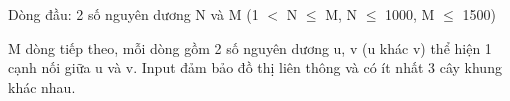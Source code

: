 Dòng đầu: 2 số nguyên dương N và M (1 $<$ N  $\le$  M, N  $\le$  1000, M  $\le$  1500)


M dòng tiếp theo, mỗi dòng gồm 2 số nguyên dương u, v (u khác v) thể hiện 1 cạnh nối giữa u và v. Input đảm bảo đồ thị liên thông và có ít nhất 3 cây khung khác nhau.